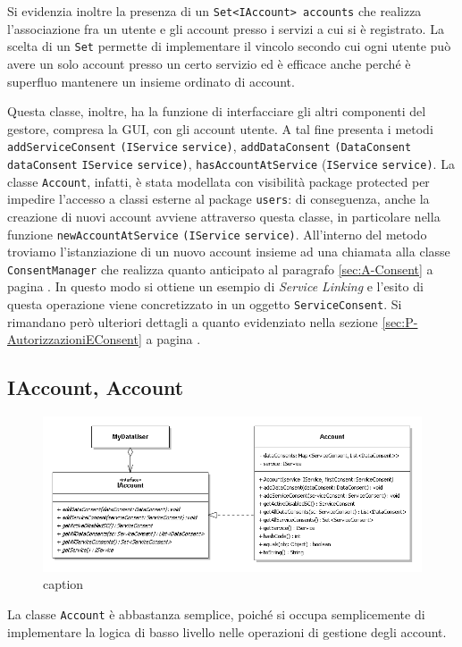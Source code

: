 Si evidenzia inoltre la presenza di un \texttt{Set<IAccount> accounts} che realizza l’associazione fra un utente e gli account presso i servizi a cui si \`e registrato. La scelta di un \texttt{Set} permette di implementare il vincolo secondo cui ogni utente pu\`o avere un solo account presso un certo servizio ed \`e efficace anche perch\'e \`e superfluo mantenere un insieme ordinato di account.

Questa classe, inoltre, ha la funzione di interfacciare gli altri componenti del gestore, compresa la GUI, con gli account utente. A tal fine presenta i metodi \texttt{addServiceConsent} \texttt{(IService} \texttt{service)}, \texttt{addDataConsent} \texttt{(DataConsent} \texttt{dataConsent} \texttt{IService} \texttt{service)}, \texttt{hasAccountAtService} (\texttt{IService} \texttt{service)}.  La classe \texttt{Account}, infatti, \`e stata modellata con visibilit\`a package protected per impedire l’accesso a classi esterne al package \texttt{users}: di conseguenza, anche la creazione di nuovi account avviene attraverso questa classe, in particolare nella funzione \texttt{newAccountAtService} \texttt{(IService} \texttt{service)}. All’interno del metodo troviamo l’istanziazione di un nuovo account insieme ad una chiamata alla classe \texttt{ConsentManager} che realizza quanto anticipato al paragrafo \ref{sec:A-Consent} a pagina \pageref{sec:A-Consent}. In questo modo si ottiene un esempio di \textit{Service Linking} e l’esito di questa operazione viene concretizzato in un oggetto \texttt{ServiceConsent}. Si rimandano per\`o ulteriori dettagli a quanto evidenziato nella sezione \ref{sec:P-AutorizzazioniEConsent} a pagina \pageref{sec:P-AutorizzazioniEConsent}.

\subsection{IAccount, Account}
\begin{figure} [h]
	\includegraphics[width=\linewidth]{pictures/Accounting-Account.png}
	\caption{caption}
	\label{fig:Accounting-Account}
\end{figure}
La classe \texttt{Account} \`e abbastanza semplice, poich\'e si occupa semplicemente di implementare la logica di basso livello nelle operazioni di gestione degli account.

